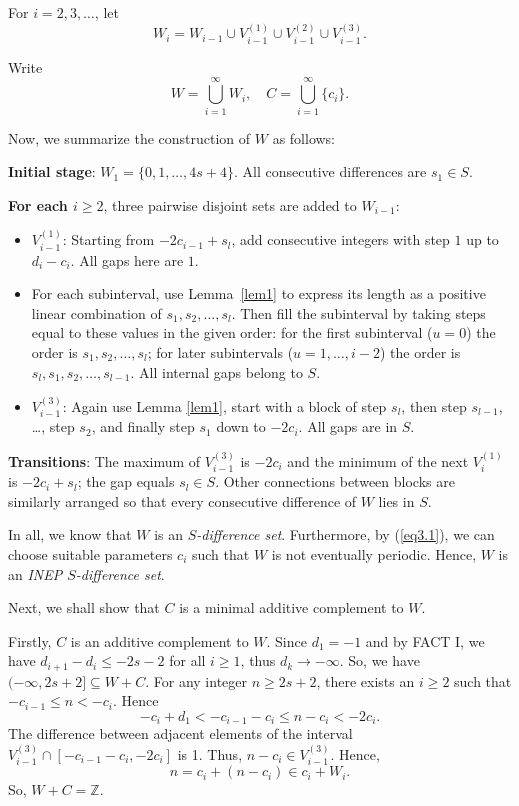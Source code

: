 \documentclass[12pt]{article}
\numberwithin{equation}{section}
\begin{document}
 For $i=2,3,\dots$, let
$$W_i = W_{i-1}\cup V_{i-1}^{(1)}\cup V_{i-1}^{(2)}\cup V_{i-1}^{(3)}.$$

Write $$W = \bigcup_{i=1}^\infty W_i,\quad C = \bigcup_{i=1}^\infty \{c_i\}.$$


Now, we summarize the construction of $W$ as follows:

 \textbf{Initial stage}: $W_1 = \{0, 1, \dots, 4s+4\}$. All consecutive differences are $s_1\in S$.

 \textbf{For each $i \ge 2$}, three pairwise disjoint sets are added to $W_{i-1}$:
   \begin{itemize}
    \item $V_{i-1}^{(1)}$: Starting from $-2c_{i-1} + s_l$, add consecutive integers with step $1$ up to $d_i - c_i$. All gaps here are $1$.

        \item  For each subinterval, use Lemma~\ref{lem1} to express its length as a positive linear combination of $s_1, s_2, \dots, s_l$. Then fill the subinterval by taking steps equal to these values in the given order: for the first subinterval ($u=0$) the order is $s_1, s_2, \dots, s_l$; for later subintervals ($u=1,\ldots,i-2$) the order is $s_l, s_1, s_2, \dots, s_{l-1}$. All internal gaps belong to $S$.

        \item $V_{i-1}^{(3)}$: Again use Lemma \ref{lem1}, start with a block of step $s_l$, then step $s_{l-1}$, \dots, step $s_2$, and finally step $s_1$ down to $-2c_i$. All gaps are in $S$.
   \end{itemize}

   \textbf{Transitions}: The maximum of $V_{i-1}^{(3)}$ is $-2c_i$ and the minimum of the next $V_i^{(1)}$ is $-2c_i + s_l$; the gap equals $s_l \in S$. Other connections between blocks are similarly arranged so that every consecutive difference of $W$ lies in $S$.

In all, we know that $W$ is an \textit{$S$-difference set}. Furthermore, by (\ref{eq3.1}), we can choose suitable parameters
$c_{i}$ such that $W$ is not eventually periodic. Hence, $W$ is an \textit{INEP $S$-difference set}.


Next, we shall show that $C$ is a minimal additive complement to $W$.

Firstly, $C$ is an additive complement to $W$.
Since $d_{1}=-1$ and by FACT I, we have $d_{i+1}-d_{i}\leqslant -2s-2$ for all $i\geq 1$, thus $d_k\rightarrow-\infty$. So, we have $(-\infty,2s+2]\subseteq W+C$. For any integer $n\geqslant 2s+2$, there exists an
$i\geqslant 2$ such that $-c_{i-1}\leqslant n<-c_i$.
Hence $$-c_{i}+d_{1}<-c_{i-1}-c_{i}\leqslant n-c_{i}<-2c_{i}.$$
The difference between adjacent elements of the interval $V_{i-1}^{(3)}\cap\left[-c_{i-1}-c_{i},-2c_{i}\right]$ is 1.
Thus, $n-c_{i}\in V_{i-1}^{(3)}$. Hence, $$n = c_i+(n-c_i)\in c_i+W_i.$$ So, $W+C=\mathbb{Z}$.
\end{document}
